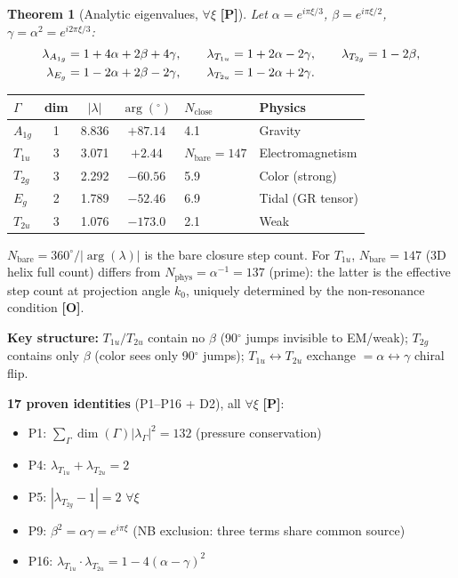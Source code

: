 \documentclass[11pt,a4paper]{article}
\newtheorem{theorem}{Theorem}[section]
\newcommand{\gradeP}{\textbf{[P]}}
\newcommand{\gradeO}{\textbf{[O]}}
\begin{document}
\begin{theorem}[Analytic eigenvalues, $\forall\xi$ \gradeP]
Let $\alpha = e^{i\pi\xi/3}$, $\beta = e^{i\pi\xi/2}$, $\gamma = \alpha^2 = e^{i2\pi\xi/3}$:
\begin{align}
\lambda_{A_{1g}} &= 1 + 4\alpha + 2\beta + 4\gamma, \qquad
\lambda_{T_{1u}} = 1 + 2\alpha - 2\gamma, \qquad
\lambda_{T_{2g}} = 1 - 2\beta, \notag\\
\lambda_{E_g} &= 1 - 2\alpha + 2\beta - 2\gamma, \qquad
\lambda_{T_{2u}} = 1 - 2\alpha + 2\gamma.
\end{align}
\end{theorem}

\begin{center}
\begin{tabular}{lcccll}
\toprule
$\Gamma$ & dim & $|\lambda|$ & $\arg({}^\circ)$ & $N_{\mathrm{close}}$ & Physics \\
\midrule
$A_{1g}$ & 1 & 8.836 & $+87.14$ & 4.1 & Gravity \\
$T_{1u}$ & 3 & 3.071 & $+2.44$ & $N_{\mathrm{bare}}{=}147$ & Electromagnetism \\
$T_{2g}$ & 3 & 2.292 & $-60.56$ & 5.9 & Color (strong) \\
$E_g$ & 2 & 1.789 & $-52.46$ & 6.9 & Tidal (GR tensor) \\
$T_{2u}$ & 3 & 1.076 & $-173.0$ & 2.1 & Weak \\
\bottomrule
\end{tabular}
\end{center}

$N_{\mathrm{bare}} = 360^\circ/|\arg(\lambda)|$ is the bare closure step count. For $T_{1u}$, $N_{\mathrm{bare}} = 147$ (3D helix full count) differs from $N_{\mathrm{phys}} = \alpha^{-1} = 137$ (prime): the latter is the effective step count at projection angle $k_0$, uniquely determined by the non-resonance condition \gradeO.

\textbf{Key structure:} $T_{1u}/T_{2u}$ contain no $\beta$ (90$^\circ$ jumps invisible to EM/weak); $T_{2g}$ contains only $\beta$ (color sees only 90$^\circ$ jumps); $T_{1u}\leftrightarrow T_{2u}$ exchange $= \alpha\leftrightarrow\gamma$ chiral flip.

\textbf{17 proven identities} (P1--P16 + D2), all $\forall\xi$ \gradeP:
\begin{itemize}[nosep]
\item P1: $\sum_\Gamma \dim(\Gamma)|\lambda_\Gamma|^2 = 132$ (pressure conservation)
\item P4: $\lambda_{T_{1u}} + \lambda_{T_{2u}} = 2$
\item P5: $|\lambda_{T_{2g}} - 1| = 2$ $\forall\xi$
\item P9: $\beta^2 = \alpha\gamma = e^{i\pi\xi}$ (NB exclusion: three terms share common source)
\item P16: $\lambda_{T_{1u}}\cdot\lambda_{T_{2u}} = 1 - 4(\alpha-\gamma)^2$
\end{itemize}
\end{document}
